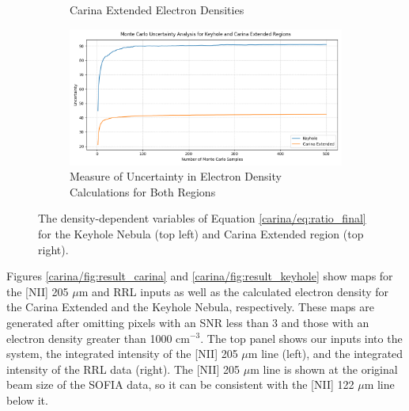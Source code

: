 \begin{figure}
\begin{subfigure}[t]{0.45\textwidth}
        \caption{Carina Extended Electron Densities}
        \label{carina/fig:calculations_carina}
    \end{subfigure}
    \begin{subfigure}[t]{\textwidth}
        \centering
        \includegraphics[width=\textwidth]{figs/carina/monte_carlo.png}
        \caption{Measure of Uncertainty in Electron Density Calculations for Both Regions}
        \label{carina/fig:monte_carlo}
    \end{subfigure}
    \caption[Density Dependent Variables for Electron Density Calculations and Monte Carlo Simulation]{
        The density-dependent variables of Equation \ref{carina/eq:ratio_final} for the Keyhole Nebula (top left) and Carina Extended region (top right).
        }
    \label{carina/fig:calculations}
\end{figure}

Figures \ref{carina/fig:result_carina} and \ref{carina/fig:result_keyhole} show maps for the [NII] 205 $\mu$m and RRL inputs as well as the calculated electron density for the Carina Extended and the Keyhole Nebula, respectively.
These maps are generated after omitting pixels with an SNR less than 3 and those with an electron density greater than 1000 cm$^{-3}$.
The top panel shows our inputs into the system, the integrated intensity of the [NII] 205 $\mu$m line (left), and the integrated intensity of the RRL data (right).
The [NII] 205 $\mu$m line is shown at the original beam size of the SOFIA data, so it can be consistent with the [NII] 122 $\mu$m line below it.

